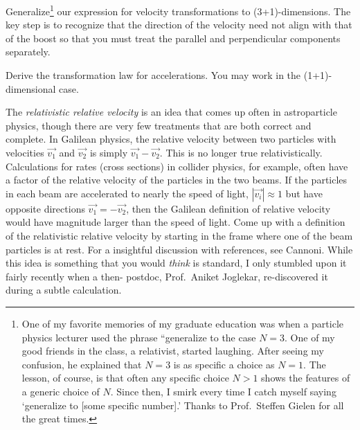 \begin{exercise}
Generalize\footnote{One of my favorite memories of my graduate education was when a particle physics lecturer used the phrase ``generalize to the case $N=3$. One of my good friends in the class, a relativist, started laughing. After seeing my confusion, he explained that $N=3$ is as specific a choice as $N=1$. The lesson, of course, is that often any specific choice $N>1$ shows the features of a generic choice of $N$. Since then, I smirk every time I catch myself saying `generalize to [some specific number].' Thanks to Prof.~Steffen Gielen for all the great times.} our expression for velocity transformations to (3+1)-dimensions. The key step is to recognize that the direction of the velocity need not align with that of the boost so that you must treat the parallel and perpendicular components separately. 
\end{exercise}


\begin{exercise}
Derive the transformation law for accelerations. You may work in the (1+1)-dimensional case.
\end{exercise}

\begin{exercise}
The \emph{relativistic relative velocity} is an idea that comes up often in astroparticle physics, though there are very few treatments that are both correct and complete. In Galilean physics, the relative velocity between two particles with velocities $\vec{v_1}$ and $\vec{v_2}$ is simply $\vec{v_1}-\vec{v_2}$. This is no longer true relativistically. Calculations for rates (cross sections) in collider physics, for example, often have a factor of the relative velocity of the particles in the two beams. If the particles in each beam are accelerated to nearly the speed of light, $|\vec{v_i}| \approx 1$ but have opposite directions $\vec{v_1} = - \vec{v_2}$, then the Galilean definition of relative velocity would have magnitude larger than the speed of light. Come up with a definition of the relativistic relative velocity by starting in the frame where one of the beam particles is at rest. For a insightful discussion with references, see Cannoni.\autocite{Cannoni:2013bza} While this idea is something that you would \emph{think} is standard, I only stumbled upon it fairly recently when a then- postdoc, Prof.~Aniket Joglekar, re-discovered it during a subtle calculation.\autocite{Joglekar:2020liw}
\end{exercise}



